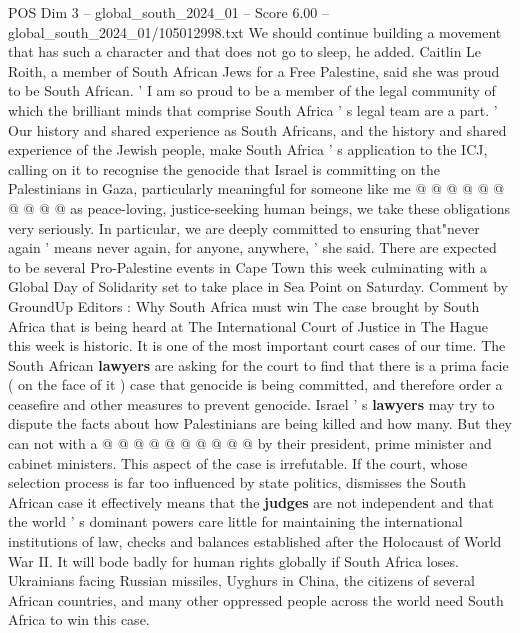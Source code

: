 \begin{textsample}{POS Dim 3 – global\_south\_2024\_01 – Score 6.00 – global\_south\_2024\_01/105012998.txt}
We should continue building a movement that has such a character and that does not go to sleep, he added.
Caitlin Le Roith, a member of South African Jews for a Free Palestine, said she was proud to be South African. ' I am so proud to be a member of the legal community of which the brilliant minds that comprise South Africa ' s legal team are a part. ' Our history and shared experience as South Africans, and the history and shared experience of the Jewish people, make South Africa ' s application to the ICJ, calling on it to recognise the genocide that Israel is committing on the Palestinians in Gaza, particularly meaningful for someone like me @ @ @ @ @ @ @ @ @ @ as peace-loving, justice-seeking human beings, we take these obligations very seriously.
In particular, we are deeply committed to ensuring that"never again ' means never again, for anyone, anywhere, ' she said.
There are expected to be several Pro-Palestine events in Cape Town this week culminating with a Global Day of Solidarity set to take place in Sea Point on Saturday.
Comment by GroundUp Editors : Why South Africa must win The case brought by South Africa that is being heard at The International Court of Justice in The Hague this week is historic.
It is one of the most important court cases of our time.
The South African \textbf{lawyers} are asking for the court to find that there is a prima facie ( on the face of it ) case that genocide is being committed, and therefore order a ceasefire and other measures to prevent genocide.
Israel ' s \textbf{lawyers} may try to dispute the facts about how Palestinians are being killed and how many.
But they can not with a @ @ @ @ @ @ @ @ @ @ by their president, prime minister and cabinet ministers.
This aspect of the case is irrefutable.
If the court, whose selection process is far too influenced by state politics, dismisses the South African case it effectively means that the \textbf{judges} are not independent and that the world ' s dominant powers care little for maintaining the international institutions of law, checks and balances established after the Holocaust of World War II.
It will bode badly for human rights globally if South Africa loses.
Ukrainians facing Russian missiles, Uyghurs in China, the citizens of several African countries, and many other oppressed people across the world need South Africa to win this case.

\end{textsample}
